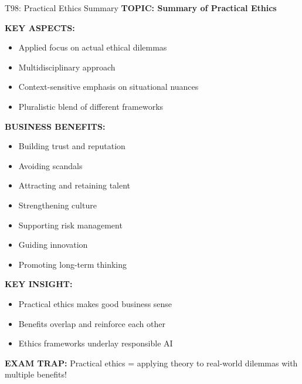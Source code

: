 \documentclass[8pt]{beamer}
\begin{document}
	\begin{frame}{T98: Practical Ethics Summary}
		\fontsize{6.5}{7.5}\selectfont
		\textbf{TOPIC: Summary of Practical Ethics}
		
		\vspace{0.1cm}
		\textbf{KEY ASPECTS:}
		\begin{itemize}
			\item Applied focus on actual ethical dilemmas
			\item Multidisciplinary approach
			\item Context-sensitive emphasis on situational nuances
			\item Pluralistic blend of different frameworks
		\end{itemize}
		
		\vspace{0.1cm}
		\textbf{BUSINESS BENEFITS:}
		\begin{itemize}
			\item Building trust and reputation
			\item Avoiding scandals
			\item Attracting and retaining talent
			\item Strengthening culture
			\item Supporting risk management
			\item Guiding innovation
			\item Promoting long-term thinking
		\end{itemize}
		
		\vspace{0.1cm}
		\textbf{KEY INSIGHT:}
		\begin{itemize}
			\item Practical ethics makes good business sense
			\item Benefits overlap and reinforce each other
			\item Ethics frameworks underlay responsible AI
		\end{itemize}
		
		\textcolor{myred}{\textbf{EXAM TRAP:}} Practical ethics = \textcolor{myblue}{applying theory to real-world dilemmas} with multiple benefits!
	\end{frame}
	
\end{document}
